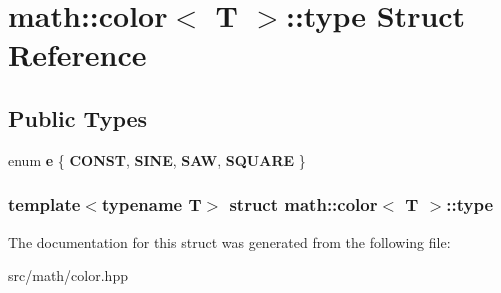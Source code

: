 \hypertarget{structmath_1_1color_1_1type}{
\section{math::color$<$ T $>$::type Struct Reference}
\label{structmath_1_1color_1_1type}
}
\subsection*{Public Types}
\begin{DoxyCompactItemize}
\item 
enum {\bfseries e} \{ {\bfseries CONST}, 
{\bfseries SINE}, 
{\bfseries SAW}, 
{\bfseries SQUARE}
 \}
\end{DoxyCompactItemize}
\subsubsection*{template$<$typename T$>$ struct math::color$<$ T $>$::type}



The documentation for this struct was generated from the following file:\begin{DoxyCompactItemize}
\item 
src/math/color.hpp\end{DoxyCompactItemize}
